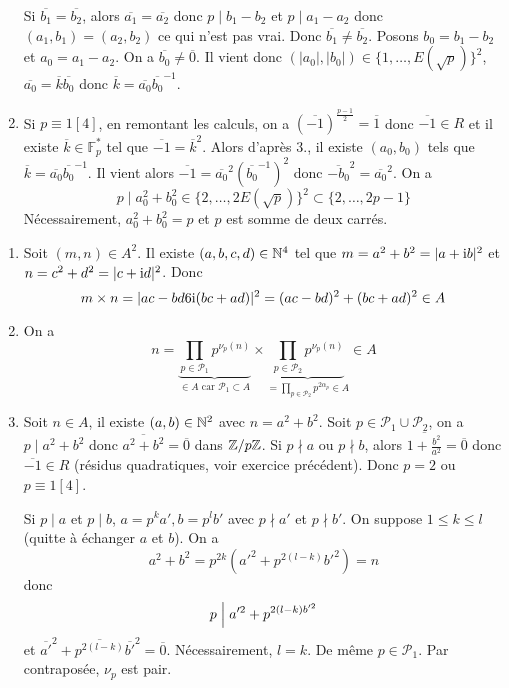 \begin{solution}
\begin{enumerate}
		Si $\overline{b_{1}}=\overline{b_{2}}$, alors $\overline{a_{1}}=\overline{a_{2}}$ donc $p\mid b_{1}-b_{2}$ et $p\mid a_{1}-a_{2}$ donc $(a_{1},b_{1})=(a_{2},b_{2})$ ce qui n'est pas vrai. Donc $\overline{b_{1}}\neq\overline{b_{2}}$. Posons $b_{0}=b_{1}-b_{2}$ et $a_{0}=a_{1}-a_{2}$. On a $\overline{b_{0}}\neq\overline{0}$. Il vient donc $(\vert a_{0}\vert,\vert b_{0}\vert)\in\{1,\dots,E(\sqrt{p})\}^{2}$, $\overline{a_{0}}=\overline{k}\overline{b_{0}}$ donc $\overline{k}=\overline{a_{0}}\overline{b_{0}}^{-1}$.

		\item Si $p\equiv 1[4]$, en remontant les calculs, on a $(\overline{-1})^{\frac{p-1}{2}}=\overline{1}$ donc $\overline{-1}\in R$ et il existe $\overline{k}\in\mathbb{F}_{p}^{*}$ tel que $\overline{-1}=\overline{k}^{2}$. Alors d'après 3., il existe $(a_{0},b_{0})$ tels que $\overline{k}=\overline{a_{0}}\overline{b_{0}}^{-1}$. Il vient alors $\overline{-1}=\overline{a_{0}}^{2}(\overline{b_{0}}^{-1})^{2}$ donc $\overline{-b_{0}}^{2}=\overline{a_{0}}^{2}$. On a 
		$$p\mid a_{0}^{2}+b_{0}^{2}\in\{2,\dots,2E(\sqrt{p})\}^{2}\subset\{2,\dots,2p-1\}$$
		Nécessairement, $a_{0}^{2}+b_{0}^{2}=p$ et $p$ est somme de deux carrés.
	\end{enumerate}
\end{solution}

\begin{solution}
	\phantom{}
	\begin{enumerate}
		\item Soit $(m,n)\in A^{2}$. Il existe $(a,b,c,d)\in\mathbb{N}^{4}$ tel que $m=a^{2}+b^{2}=\vert a+\mathrm{i} b\vert^{2}$ et $n=c^{2}+d^{2}=\vert c+\mathrm{i} d\vert^{2}$. Donc 
		$$m\times n=\vert ac-bd6\mathrm{i}(bc+ad)\vert^{2}=(ac-bd)^{2}+(bc+ad)^{2}\in A$$
		\item On a 
		$$n=\underbrace{\prod_{p\in\mathcal{P}_{1}}p^{\nu_{p}(n)}}_{\in A\text{ car }\mathcal{P}_{1}\subset A}\times\underbrace{\prod_{p\in\mathcal{P}_{2}}p^{\nu_{p}(n)}}_{=\prod_{p\in\mathcal{P}_{2}}p^{2\alpha_{p}}\in A}\in A$$

		\item Soit $n\in A$, il existe $(a,b)\in\mathbb{N}^{2}$ avec $n=a^{2}+b^{2}$. Soit $p\in \mathcal{P}_{1}\cup\mathcal{P}_{2}$, on a $p\mid a^{2}+b^{2}$ donc $\overline{a^{2}+b^{2}}=\overline{0}$ dans $\mathbb{Z}/p\mathbb{Z}$. Si $p\nmid a$ ou $p\nmid b$, alors $\overline{1+\frac{b^{2}}{a^{2}}}=\overline{0}$ donc $\overline{-1}\in R$ (résidus quadratiques, voir exercice précédent). Donc $p=2$ ou $p\equiv 1[4]$.
		
		Si $p\mid a$ et $p\mid b$, $a=p^{k}a', b=p^{l}b'$ avec $p\nmid a'$ et $p\nmid b'$. On suppose $1\leqslant k\leqslant l$ (quitte à échanger $a$ et $b$).
		On a 
		$$a^{2}+b^{2}=p^{2k}(a'^{2}+p^{2(l-k)}b'^{2})=n$$
		donc 
		$$p\Bigm| a'^{2}+p^{2(l-k)b'^{2}}$$
		et $\overline{a'}^{2}+\overline{p^{2(l-k)}}\overline{b'}^{2}=\overline{0}$. Nécessairement, $l=k$. De même $p\in\mathcal{P}_{1}$. Par contraposée, $\nu_{p}$ est pair.
	\end{enumerate}
\end{solution}